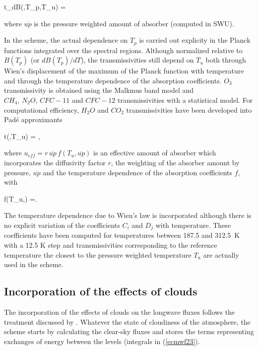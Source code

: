 \medskip
\be
t_{dB}(,T_p,T_u) = 
\label{ecmwf26b}
\ee
\medskip

\noindent where $\overline{up}$ is the pressure weighted amount of absorber (computed in SWU).


In the scheme, the actual dependence on $T_p$ is carried out explicity in the Planck functions integrated over the spectral regions. Although normalized relative to $B(T_p)$ (or $dB(T_p)/dT$), the transmissivities still depend on $T_u$ both through Wien's displacement of the maximum of the Planck function with temperature and through the temperature dependence of the absorption coefficients.
$O_3$ transmissivity is obtained using the Malkmus band model and $CH_4,\,N_2O,\,CFC-11$ and $CFC-12$ transmissivities with a statistical model. 
For computational efficiency, $H_2O$ and $CO_2$ transmissivities have been developed into Pad\'e approximants


\medskip
\be
t(,T_u) = ,
\label{ecmwf27}
\ee
\medskip

\noindent where $u_{eff} = r \, \overline{up} \, f(T_u,\overline{up})$ is an effective amount of absorber which incorporates the diffusivity factor $r$, the weighting of the absorber amount by pressure, $\overline{up}$ and the temperature dependence of the absorption coefficients $f$, with

\medskip
\be
f(T_u,) =.
\label{ecmwf28}
\ee
\medskip

The temperature dependence due to Wien's law is incorporated although there is no explicit variation of the coefficients $C_i$ and $D_j$ with temperature. These coefficients have been computed for temperatures between 187.5 and 312.5~K with a 12.5 K step and transmissivities corresponding to the reference temperature the closest to the pressure weighted temperature $T_u$ are actually used in the scheme.

%
\subsection{Incorporation of the effects of clouds}
%

The incorporation of the effects of clouds on the longwave fluxes follows the treatment discussed by \citet{Washington1977}. Whatever the state of cloudiness of the atmosphere, the scheme starts by calculating the clear-sky fluxes and stores the terms representing exchanges of energy between the levels (integrals in (\ref{ecmwf23}).


